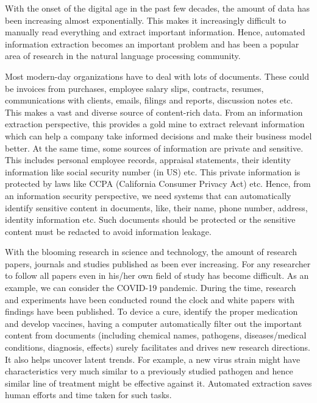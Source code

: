 With the onset of the digital age in the past few decades, the amount of data has been increasing almost exponentially. This makes it increasingly difficult to manually read everything and extract important information. Hence, automated information extraction becomes an important problem and has been a popular area of research in the natural language processing community. 

Most modern-day organizations have to deal with lots of documents. These could be invoices from purchases, employee salary slips, contracts, resumes, communications with clients, emails, filings and reports, discussion notes etc. This makes a vast and diverse source of content-rich data. From an information extraction perspective, this provides a gold mine to extract relevant information which can help a company take informed decisions and make their business model better. At the same time, some sources of information are private and sensitive. This includes personal employee records, appraisal statements, their identity information like social security number (in US) etc. This private information is protected by laws like CCPA (California Consumer Privacy Act) etc. Hence, from an information security perspective, we need systems that can automatically identify sensitive content in documents, like, their name, phone number, address, identity information etc. Such documents should be protected or the sensitive content must be redacted to avoid information leakage.

With the blooming research in science and technology, the amount of research papers, journals and studies published as been ever increasing. For any researcher to follow all papers even in his/her own field of study has become difficult. As an example, we can consider the COVID-19 pandemic. During the time, research and experiments have been conducted round the clock and white papers with findings have been published. To device a cure, identify the proper medication and develop vaccines, having a computer automatically filter out the important content from documents (including chemical names, pathogens, diseases/medical conditions, diagnosis, effects) surely facilitates and drives new research directions. It also helps uncover latent trends. For example, a new virus strain might have characteristics very much similar to a previously studied pathogen and hence similar line of treatment might be effective against it. Automated extraction saves human efforts and time taken for such tasks.

